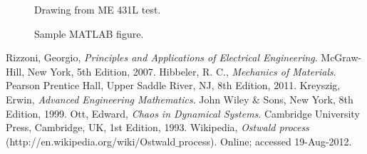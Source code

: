 \documentclass{article}
\begin{document}
\begin{figure}[htb]
\begin{center}
\caption{Drawing from ME 431L test.}
\end{center}
\end{figure}

\begin{figure}[htb]
\begin{center}
\caption{Sample MATLAB figure.}
\end{center}
\end{figure}
\pagebreak

\begin{thebibliography}{9}
Rizzoni, Georgio,
{\it Principles and Applications of Electrical Engineering}.
McGraw-Hill, New York,
5th Edition,
2007.
Hibbeler, R. C.,
{\it Mechanics of Materials}.
Pearson Prentice Hall, Upper Saddle River, NJ, 8th Edition, 2011.
Kreyszig, Erwin,
{\it Advanced Engineering Mathematics}.
John Wiley \& Sons, New York, 8th Edition, 1999.
Ott, Edward,
{\it Chaos in Dynamical Systems}.
Cambridge University Press, Cambridge, UK, 1st Edition, 1993.
Wikipedia, 
{\it Ostwald process} (http://en.wikipedia.org/wiki/Ostwald$\_$process).
Online; accessed 19-Aug-2012.
\end{thebibliography}
\end{document}
